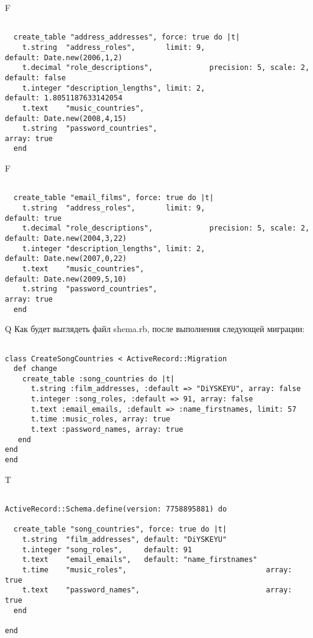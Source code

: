 F
\begin{verbatim}

  create_table "address_addresses", force: true do |t|
    t.string  "address_roles",       limit: 9,                         default: Date.new(2006,1,2)
    t.decimal "role_descriptions",             precision: 5, scale: 2, default: false
    t.integer "description_lengths", limit: 2,                         default: 1.8051187633142054
    t.text    "music_countries",                                       default: Date.new(2008,4,15)
    t.string  "password_countries",                                                                  array: true
  end

\end{verbatim}

F
\begin{verbatim}

  create_table "email_films", force: true do |t|
    t.string  "address_roles",       limit: 9,                         default: true
    t.decimal "role_descriptions",             precision: 5, scale: 2, default: Date.new(2004,3,22)
    t.integer "description_lengths", limit: 2,                         default: Date.new(2007,0,22)
    t.text    "music_countries",                                       default: Date.new(2009,5,10)
    t.string  "password_countries",                                                                  array: true
  end

\end{verbatim}

Q
Как будет выглядеть файл shema.rb, после выполнения следующей миграции:

\begin{verbatim}

class CreateSongCountries < ActiveRecord::Migration 
  def change 
    create_table :song_countries do |t| 
      t.string :film_addresses, :default => "DiYSKEYU", array: false
      t.integer :song_roles, :default => 91, array: false
      t.text :email_emails, :default => :name_firstnames, limit: 57
      t.time :music_roles, array: true
      t.text :password_names, array: true
   end
end
end
\end{verbatim}

T
\begin{verbatim}

ActiveRecord::Schema.define(version: 7758895881) do

  create_table "song_countries", force: true do |t|
    t.string  "film_addresses", default: "DiYSKEYU"
    t.integer "song_roles",     default: 91
    t.text    "email_emails",   default: "name_firstnames"
    t.time    "music_roles",                                array: true
    t.text    "password_names",                             array: true
  end

end
\end{verbatim}


